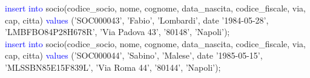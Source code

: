 \documentclass{article}
\begin{document}
\begin{flushleft}
{        \hspace*{0.5em}\textcolor{blue}{insert into} socio(codice\_socio, nome, cognome, data\_nascita, codice\_fiscale, via, \hspace*{0.5em}cap, citta) \textcolor{blue}{values} ('SOC000043', 'Fabio', 'Lombardi', date '1984-05-28', \hspace*{0.4em}'LMBFBO84P28H678R', 'Via Padova 43', '80148', 'Napoli'); \\
        \hspace*{0.5em}\textcolor{blue}{insert into} socio(codice\_socio, nome, cognome, data\_nascita, codice\_fiscale, via, \hspace*{0.5em}cap, citta) \textcolor{blue}{values} ('SOC000044', 'Sabino', 'Malese', date '1985-05-15', \hspace*{0.4em}'MLSSBN85E15F839L', 'Via Roma 44', '80144', 'Napoli'); \\}
    \end{flushleft}
\end{document}
